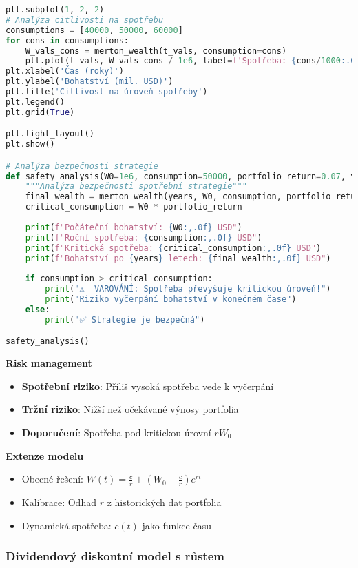 \begin{example}
\begin{lstlisting}[language=Python, caption={Implementace Mertonova modelu v Pythonu}, label={lst:merton}]
plt.subplot(1, 2, 2)
# Analýza citlivosti na spotřebu
consumptions = [40000, 50000, 60000]
for cons in consumptions:
    W_vals_cons = merton_wealth(t_vals, consumption=cons)
    plt.plot(t_vals, W_vals_cons / 1e6, label=f'Spotřeba: {cons/1000:.0f}k USD')
plt.xlabel('Čas (roky)')
plt.ylabel('Bohatství (mil. USD)')
plt.title('Citlivost na úroveň spotřeby')
plt.legend()
plt.grid(True)

plt.tight_layout()
plt.show()

# Analýza bezpečnosti strategie
def safety_analysis(W0=1e6, consumption=50000, portfolio_return=0.07, years=30):
    """Analýza bezpečnosti spotřební strategie"""
    final_wealth = merton_wealth(years, W0, consumption, portfolio_return)
    critical_consumption = W0 * portfolio_return
    
    print(f"Počáteční bohatství: {W0:,.0f} USD")
    print(f"Roční spotřeba: {consumption:,.0f} USD")
    print(f"Kritická spotřeba: {critical_consumption:,.0f} USD")
    print(f"Bohatství po {years} letech: {final_wealth:,.0f} USD")
    
    if consumption > critical_consumption:
        print("⚠️  VAROVÁNÍ: Spotřeba převyšuje kritickou úroveň!")
        print("Riziko vyčerpání bohatství v konečném čase")
    else:
        print("✅ Strategie je bezpečná")

safety_analysis()
\end{lstlisting}

\noindent\textbf{Risk management}
\begin{itemize}
\item \textbf{Spotřební riziko}: Příliš vysoká spotřeba vede k vyčerpání
\item \textbf{Tržní riziko}: Nižší než očekávané výnosy portfolia
\item \textbf{Doporučení}: Spotřeba pod kritickou úrovní $r W_0$
\end{itemize}

\noindent\textbf{Extenze modelu}
\begin{itemize}
\item Obecné řešení: $\displaystyle W(t) = \frac{c}{r} + \left(W_0 - \frac{c}{r}\right) e^{rt}$
\item Kalibrace: Odhad $r$ z historických dat portfolia
\item Dynamická spotřeba: $c(t)$ jako funkce času
\end{itemize}
\end{example}

\subsubsection{Dividendový diskontní model s růstem}
\label{subsec:dividendovy-model}

